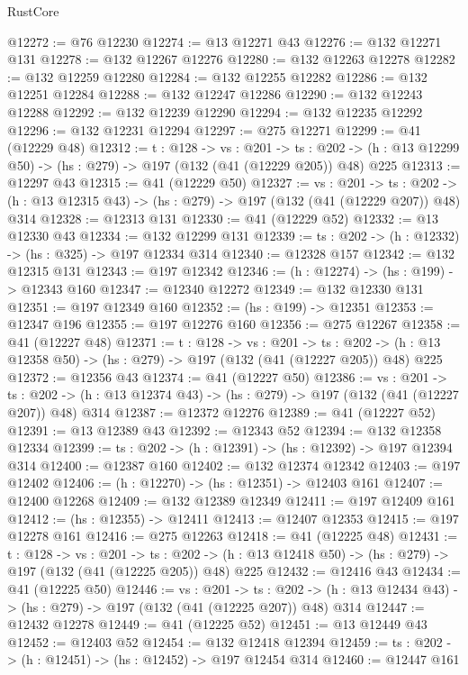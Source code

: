 \begin{lexlean}{RustCore}
\begin{coremodule}
@12272 := @76 @12230
@12274 := @13 @12271 @43
@12276 := @132 @12271 @131
@12278 := @132 @12267 @12276
@12280 := @132 @12263 @12278
@12282 := @132 @12259 @12280
@12284 := @132 @12255 @12282
@12286 := @132 @12251 @12284
@12288 := @132 @12247 @12286
@12290 := @132 @12243 @12288
@12292 := @132 @12239 @12290
@12294 := @132 @12235 @12292
@12296 := @132 @12231 @12294
@12297 := @275 @12271
@12299 := @41 (@12229 @48)
@12312 := {t : @128} ->
  {vs : @201} ->
  {ts : @202} -> (h : @13 @12299 @50) -> (hs : @279) -> @197 (@132 (@41 (@12229 @205)) @48) @225
@12313 := @12297 @43
@12315 := @41 (@12229 @50)
@12327 := {vs : @201} ->
  {ts : @202} -> (h : @13 @12315 @43) -> (hs : @279) -> @197 (@132 (@41 (@12229 @207)) @48) @314
@12328 := @12313 @131
@12330 := @41 (@12229 @52)
@12332 := @13 @12330 @43
@12334 := @132 @12299 @131
@12339 := {ts : @202} -> (h : @12332) -> (hs : @325) -> @197 @12334 @314
@12340 := @12328 @157
@12342 := @132 @12315 @131
@12343 := @197 @12342
@12346 := (h : @12274) -> (hs : @199) -> @12343 @160
@12347 := @12340 @12272
@12349 := @132 @12330 @131
@12351 := @197 @12349 @160
@12352 := (hs : @199) -> @12351
@12353 := @12347 @196
@12355 := @197 @12276 @160
@12356 := @275 @12267
@12358 := @41 (@12227 @48)
@12371 := {t : @128} ->
  {vs : @201} ->
  {ts : @202} -> (h : @13 @12358 @50) -> (hs : @279) -> @197 (@132 (@41 (@12227 @205)) @48) @225
@12372 := @12356 @43
@12374 := @41 (@12227 @50)
@12386 := {vs : @201} ->
  {ts : @202} -> (h : @13 @12374 @43) -> (hs : @279) -> @197 (@132 (@41 (@12227 @207)) @48) @314
@12387 := @12372 @12276
@12389 := @41 (@12227 @52)
@12391 := @13 @12389 @43
@12392 := @12343 @52
@12394 := @132 @12358 @12334
@12399 := {ts : @202} -> (h : @12391) -> (hs : @12392) -> @197 @12394 @314
@12400 := @12387 @160
@12402 := @132 @12374 @12342
@12403 := @197 @12402
@12406 := (h : @12270) -> (hs : @12351) -> @12403 @161
@12407 := @12400 @12268
@12409 := @132 @12389 @12349
@12411 := @197 @12409 @161
@12412 := (hs : @12355) -> @12411
@12413 := @12407 @12353
@12415 := @197 @12278 @161
@12416 := @275 @12263
@12418 := @41 (@12225 @48)
@12431 := {t : @128} ->
  {vs : @201} ->
  {ts : @202} -> (h : @13 @12418 @50) -> (hs : @279) -> @197 (@132 (@41 (@12225 @205)) @48) @225
@12432 := @12416 @43
@12434 := @41 (@12225 @50)
@12446 := {vs : @201} ->
  {ts : @202} -> (h : @13 @12434 @43) -> (hs : @279) -> @197 (@132 (@41 (@12225 @207)) @48) @314
@12447 := @12432 @12278
@12449 := @41 (@12225 @52)
@12451 := @13 @12449 @43
@12452 := @12403 @52
@12454 := @132 @12418 @12394
@12459 := {ts : @202} -> (h : @12451) -> (hs : @12452) -> @197 @12454 @314
@12460 := @12447 @161

\end{coremodule}
\end{lexlean}
